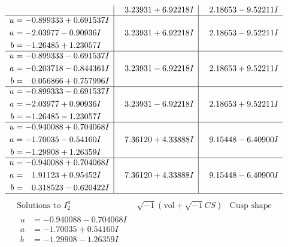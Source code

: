 \documentclass[1p]{elsarticle_modified}
\theoremstyle{definition}
\newcommand{\I}{\sqrt{-1}}
\begin{document}
$$\begin{array}{c|c|c}
 & \phantom{-}3.23931 + 6.92218 I & \phantom{-}2.18653 - 9.52211 I \\ \hline\begin{aligned}
u &= -0.899333 + 0.691537 I \\
a &= -2.03977 - 0.90936 I \\
b &= -1.26485 + 1.23057 I\end{aligned}
 & \phantom{-}3.23931 + 6.92218 I & \phantom{-}2.18653 - 9.52211 I \\ \hline\begin{aligned}
u &= -0.899333 - 0.691537 I \\
a &= -0.203718 - 0.844361 I \\
b &= \phantom{-}0.056866 + 0.757996 I\end{aligned}
 & \phantom{-}3.23931 - 6.92218 I & \phantom{-}2.18653 + 9.52211 I \\ \hline\begin{aligned}
u &= -0.899333 - 0.691537 I \\
a &= -2.03977 + 0.90936 I \\
b &= -1.26485 - 1.23057 I\end{aligned}
 & \phantom{-}3.23931 - 6.92218 I & \phantom{-}2.18653 + 9.52211 I \\ \hline\begin{aligned}
u &= -0.940088 + 0.704068 I \\
a &= -1.70035 - 0.54160 I \\
b &= -1.29908 + 1.26359 I\end{aligned}
 & \phantom{-}7.36120 + 4.33888 I & \phantom{-}9.15448 - 6.40900 I \\ \hline\begin{aligned}
u &= -0.940088 + 0.704068 I \\
a &= \phantom{-}1.91123 + 0.95452 I \\
b &= \phantom{-}0.318523 - 0.620422 I\end{aligned}
 & \phantom{-}7.36120 + 4.33888 I & \phantom{-}9.15448 - 6.40900 I\\
 \hline 
 \end{array}$$\newpage$$\begin{array}{c|c|c}  
\text{Solutions to }I^u_{2}& \I (\text{vol} + \sqrt{-1}CS) & \text{Cusp shape}\\
 \hline 
\begin{aligned}
u &= -0.940088 - 0.704068 I \\
a &= -1.70035 + 0.54160 I \\
b &= -1.29908 - 1.26359 I\end{aligned}

\end{array}$$
\end{document}

